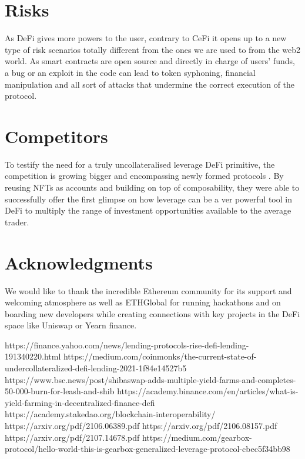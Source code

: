 \documentclass[a4paper,10 pt]{article}
\theoremstyle{definition}
\begin{document}
\section{Risks}
As DeFi gives more powers to the user, contrary to CeFi \cite{arxivCeFi} it  opens up to a new type of risk scenarios \cite{arxivIntermediation} totally different from the ones we are used to from the web2 world. As smart contracts are open source and directly in charge of users' funds, a bug or an exploit in the code can lead to token syphoning, financial manipulation and all sort of attacks that undermine the correct execution of the protocol. 

\section{Competitors}
To testify the need for a truly uncollateralised leverage DeFi primitive, the competition is growing bigger and encompassing newly formed protocols \cite{mediumGearbox}. By reusing NFTs as accounts and building on top of composability, they were able to successfully offer the first glimpse on how leverage can be a ver powerful tool in DeFi to multiply the range of investment opportunities available to the average trader.

\section{Acknowledgments}

We would like to thank the incredible Ethereum community for its support and welcoming atmosphere as well as ETHGlobal for running hackathons and on boarding new developers while creating connections with key projects in the DeFi space like Uniswap or Yearn finance.

\begin{thebibliography}{}
	
 https://finance.yahoo.com/news/lending-protocols-rise-defi-lending-191340220.html
 https://medium.com/coinmonks/the-current-state-of-undercollateralized-defi-lending-2021-1f84e14527b5
 https://www.bsc.news/post/shibaswap-adds-multiple-yield-farms-and-completes-50-000-burn-for-leash-and-shib
 https://academy.binance.com/en/articles/what-is-yield-farming-in-decentralized-finance-defi
 https://academy.stakedao.org/blockchain-interoperability/
 https://arxiv.org/pdf/2106.06389.pdf
 https://arxiv.org/pdf/2106.08157.pdf
 https://arxiv.org/pdf/2107.14678.pdf
 https://medium.com/gearbox-protocol/hello-world-this-is-gearbox-generalized-leverage-protocol-cbec5f34bb98

\end{thebibliography}
\end{document}

